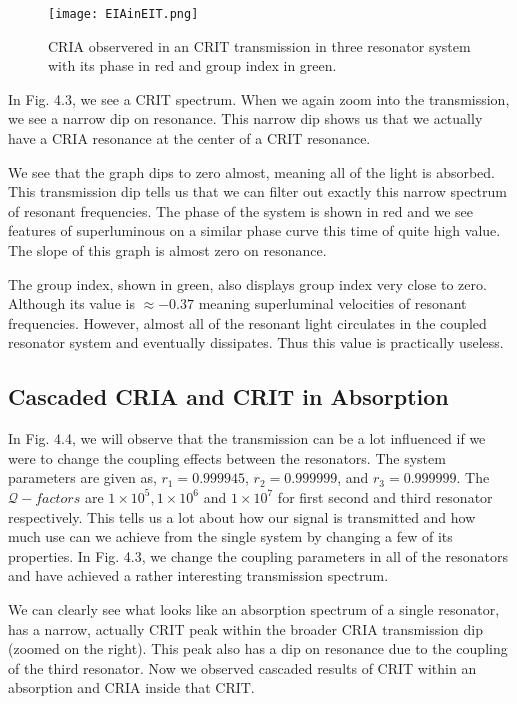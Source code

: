 \begin{figure}[t]
\centering
\texttt{[image: EIAinEIT.png]}
\caption{CRIA observered in an CRIT transmission in three resonator system with its phase in red and group index in green.}
\end{figure}

In Fig. 4.3, we see a CRIT spectrum. When we again zoom into the transmission, we see a narrow dip on resonance. This narrow dip shows us that we actually have a CRIA resonance at the center of a CRIT resonance.

We see that the graph dips to zero almost, meaning all of the light is absorbed. This transmission dip tells us that we can filter out exactly this narrow spectrum of resonant frequencies. 
The phase of the system is shown in red and we see features of superluminous on a similar phase curve this time of quite high value. The slope of this graph is almost zero on resonance.

The group index, shown in green, also displays group index very close to zero. Although its value is $\approx -0.37$ meaning superluminal velocities of resonant frequencies. However, almost all of the resonant light circulates in the coupled resonator system and eventually dissipates. Thus this value is practically useless.


\subsection{Cascaded CRIA and CRIT in Absorption}
In Fig. 4.4, we will observe that the transmission can be a lot influenced if we were to change the coupling effects between the resonators. The system parameters are given as, $r_{1} = 0.999945$, $r_{2} = 0.999999$, and $r_{3} = 0.999999$. The $\mathcal{Q}-factors$ are $1\times10^{5}, 1\times10^{6}$ and $1\times10^{7}$ for first second and third resonator respectively. This tells us a lot about how our signal is transmitted and how much use can we achieve from the single system by changing a few of its properties. In Fig. 4.3, we change the coupling parameters in all of the resonators and have achieved a rather interesting transmission spectrum.

We can clearly see what looks like an absorption spectrum of a single resonator, has a narrow, actually CRIT peak within the broader CRIA transmission dip (zoomed on the right). This peak also has a dip on resonance due to the coupling of the third resonator. Now we observed cascaded results of CRIT within an absorption and CRIA inside that CRIT. 

